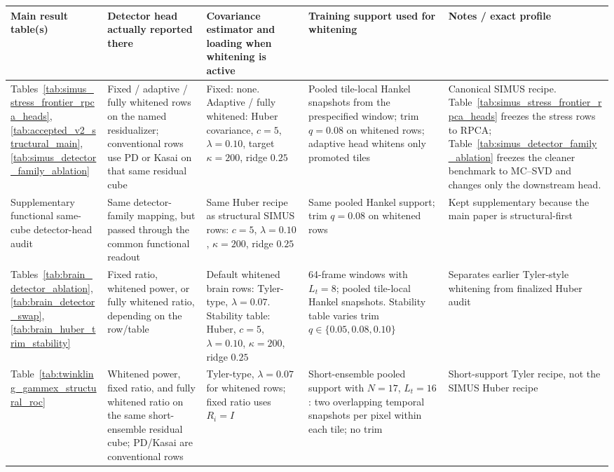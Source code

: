 \documentclass[11pt]{article}
\begin{document}
\begin{center}
\captionsetup{type=table}
\scriptsize
\begingroup
\setlength{\tabcolsep}{3pt}
\begin{tabular}{@{}P{3.2cm} P{2.8cm} P{4.2cm} P{4.3cm} P{2.9cm}@{}}
\hline
Main result table(s) & Detector head actually reported there & Covariance estimator and loading when whitening is active & Training support used for whitening & Notes / exact profile \\
\hline
Tables~\ref{tab:simus_stress_frontier_rpca_heads}, \ref{tab:accepted_v2_structural_main}, \ref{tab:simus_detector_family_ablation} & Fixed / adaptive / fully whitened rows on the named residualizer; conventional rows use PD or Kasai on that same residual cube & Fixed: none. Adaptive / fully whitened: Huber covariance, $c=5$, $\lambda=0.10$, target $\kappa=200$, ridge $0.25$ & Pooled tile-local Hankel snapshots from the prespecified window; trim $q=0.08$ on whitened rows; adaptive head whitens only promoted tiles & Canonical SIMUS recipe. Table~\ref{tab:simus_stress_frontier_rpca_heads} freezes the stress rows to RPCA; Table~\ref{tab:simus_detector_family_ablation} freezes the cleaner benchmark to MC--SVD and changes only the downstream head. \\
Supplementary functional same-cube detector-head audit & Same detector-family mapping, but passed through the common functional readout & Same Huber recipe as structural SIMUS rows: $c=5$, $\lambda=0.10$, $\kappa=200$, ridge $0.25$ & Same pooled Hankel support; trim $q=0.08$ on whitened rows & Kept supplementary because the main paper is structural-first \\
Tables~\ref{tab:brain_detector_ablation}, \ref{tab:brain_detector_swap}, \ref{tab:brain_huber_trim_stability} & Fixed ratio, whitened power, or fully whitened ratio, depending on the row/table & Default whitened brain rows: Tyler-type, $\lambda=0.07$. Stability table: Huber, $c=5$, $\lambda=0.10$, $\kappa=200$, ridge $0.25$ & 64-frame windows with $L_t=8$; pooled tile-local Hankel snapshots. Stability table varies trim $q\in\{0.05,0.08,0.10\}$ & Separates earlier Tyler-style whitening from finalized Huber audit \\
Table~\ref{tab:twinkling_gammex_structural_roc} & Whitened power, fixed ratio, and fully whitened ratio on the same short-ensemble residual cube; PD/Kasai are conventional rows & Tyler-type, $\lambda=0.07$ for whitened rows; fixed ratio uses $R_i=I$ & Short-ensemble pooled support with $N=17$, $L_t=16$: two overlapping temporal snapshots per pixel within each tile; no trim & Short-support Tyler recipe, not the SIMUS Huber recipe \\

\end{tabular}
\end{center}
\end{document}
